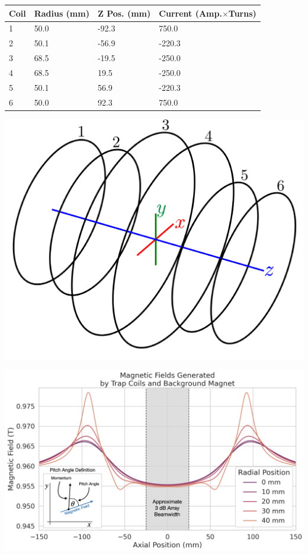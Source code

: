 \begin{table}[htbp]
    \footnotesize
    \begin{minipage}{0.65\textwidth}
        \centering
        \begin{tabular}{llll}
            \hline
            Coil & Radius (mm) & Z Pos. (mm) & Current (Amp.$\times$Turns)\\
            \hline
            1 & 50.0 & -92.3 & 750.0\\
            2 & 50.1 & -56.9 & -220.3\\
            3 & 68.5 & -19.5 & -250.0\\
            4 & 68.5 & 19.5 & -250.0\\
            5 & 50.1 & 56.9 & -220.3\\
            6 & 50.0 & 92.3 & 750.0\\
            \hline
        \end{tabular}
        \end{minipage}
    \begin{minipage}{0.35\textwidth}
        \centering
        \includegraphics[width=1\textwidth]{figs/Chapter-4/230512_trap10_coils.png}
        \label{fig:chap4-trap10-coils} 
    \end{minipage}
    \par
    \centering
    \begin{minipage}{0.7\textwidth}
        \centering
        \includegraphics[width=1\textwidth]{figs/Chapter-4/230214_annotate_trap_profile_image.001.png}

\end{minipage}
\end{table}
